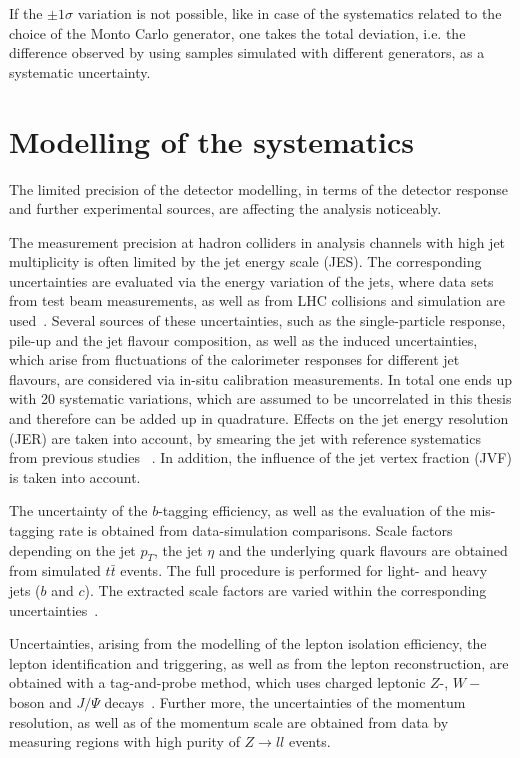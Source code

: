 If the $\pm 1 \sigma$ variation is not possible, like in case of the systematics related to the choice of the Monto Carlo generator, one takes the total deviation, i.e. the difference observed by using samples simulated with different generators, as a systematic uncertainty. 


	

\section{Modelling of the systematics}
The limited precision of the detector modelling, in terms of the detector response and further experimental sources, are affecting the analysis noticeably. 

 The measurement precision at hadron colliders in analysis channels with high jet multiplicity is often limited by the jet energy scale (JES). The corresponding uncertainties are evaluated via the energy variation of the jets, where
data sets from test beam measurements, as well as from LHC collisions and simulation are used~\cite{Aad:2011he, Aad:2012ag, Aad:2012vm,Aad:2014bia}. Several sources of these uncertainties, such as the single-particle response, pile-up and the jet flavour composition, as well as the induced uncertainties, which arise from fluctuations of the calorimeter responses for different jet flavours, 
 are considered via in-situ calibration measurements.  In total one ends up with 20 systematic variations, which are assumed to be uncorrelated in this thesis and therefore can be added up in quadrature. 
 Effects on the jet energy resolution (JER) are taken into account, by smearing the jet with reference systematics from previous studies ~\cite{ATL-PHYS-PUB-2015-015}.
 In addition, the influence of the  jet vertex fraction (JVF)  is taken into account.
 

 The uncertainty of the $b$-tagging efficiency, as well as the evaluation of the mis-tagging rate is obtained from data-simulation comparisons. Scale factors depending on the jet $p_T$, the jet $\eta$ and the underlying quark flavours are obtained from simulated $t\bar{t}$ events.  
The full procedure is performed  for  light- and heavy jets ($b$ and $c$). The extracted scale factors are varied within the corresponding uncertainties~\cite{ATLAS-CONF-2014-046, ATLAS-CONF-2014-004, ATL-PHYS-PUB-2015-022}.


 Uncertainties, arising from the modelling of the lepton isolation efficiency, the lepton identification and triggering, as well as from the lepton reconstruction, are obtained with a tag-and-probe method, which uses charged leptonic  $Z$-, $W-$boson and $J/\Psi$ decays~\cite{ATLAS:2016iqc,ATL-PHYS-PUB-2016-015,Aad:2011mk,Aad:2016jkr}. Further more, the uncertainties of the  momentum resolution,  as well as of the momentum scale  are  obtained from data by measuring regions with high purity of  $Z \rightarrow ll$ events.

